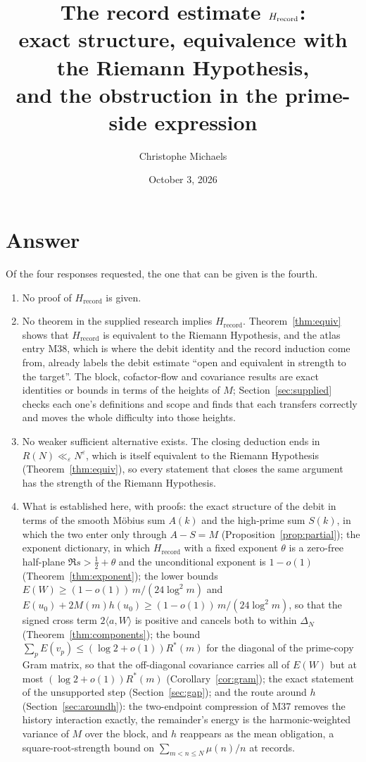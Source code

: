 \documentclass[11pt]{article}
\title{The record estimate $\Hrec$:\\ exact structure, equivalence with the Riemann Hypothesis,\\ and the obstruction in the prime-side expression}
\author{Christophe Michaels}
\date{October 3, 2026}
\theoremstyle{definition}
\theoremstyle{remark}
\newcommand{\ip}[2]{\langle #1,#2\rangle}
\newcommand{\Hrec}{H_{\mathrm{record}}}
\newcommand{\Rstar}{R^{*}}
\begin{document}
\maketitle

\section*{Answer}

Of the four responses requested, the one that can be given is the fourth.
\begin{enumerate}
\item No proof of $\Hrec$ is given.
\item No theorem in the supplied research implies $\Hrec$. Theorem~\ref{thm:equiv} shows that $\Hrec$ is equivalent to the Riemann Hypothesis, and the atlas entry M38, which is where the debit identity and the record induction come from, already labels the debit estimate ``open and equivalent in strength to the target''. The block, cofactor-flow and covariance results are exact identities or bounds in terms of the heights of $M$; Section~\ref{sec:supplied} checks each one's definitions and scope and finds that each transfers correctly and moves the whole difficulty into those heights.
\item No weaker sufficient alternative exists. The closing deduction ends in $R(N)\ll_\varepsilon N^\varepsilon$, which is itself equivalent to the Riemann Hypothesis (Theorem~\ref{thm:equiv}), so every statement that closes the same argument has the strength of the Riemann Hypothesis.
\item What is established here, with proofs: the exact structure of the debit in terms of the smooth M\"obius sum $A(k)$ and the high-prime sum $S(k)$, in which the two enter only through $A-S=M$ (Proposition~\ref{prop:partial}); the exponent dictionary, in which $\Hrec$ with a fixed exponent $\theta$ is a zero-free half-plane $\Re s>\tfrac12+\theta$ and the unconditional exponent is $1-o(1)$ (Theorem~\ref{thm:exponent}); the lower bounds $E(W)\ge(1-o(1))\,m/(24\log^2 m)$ and $E(u_0)+2M(m)h(u_0)\ge(1-o(1))\,m/(24\log^2m)$, so that the signed cross term $2\ip aW$ is positive and cancels both to within $\Delta_N$ (Theorem~\ref{thm:components}); the bound $\sum_pE(v_p)\le(\log2+o(1))\Rstar(m)$ for the diagonal of the prime-copy Gram matrix, so that the off-diagonal covariance carries all of $E(W)$ but at most $(\log2+o(1))\Rstar(m)$ (Corollary~\ref{cor:gram}); the exact statement of the unsupported step (Section~\ref{sec:gap}); and the route around $h$ (Section~\ref{sec:aroundh}): the two-endpoint compression of M37 removes the history interaction exactly, the remainder's energy is the harmonic-weighted variance of $M$ over the block, and $h$ reappears as the mean obligation, a square-root-strength bound on $\sum_{m<n\le N}\mu(n)/n$ at records.
\end{enumerate}
\end{document}
